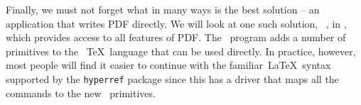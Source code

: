 Finally, we must not forget what in many ways is the best solution -- an
application that writes PDF directly. We will look at one such solution,
\pdfTEX\ , in , which provides access to all features of PDF.
The \pdfTEX\  program adds a number of primitives to the \ \TeX\
language that can be used directly. In practice, however, most people
will find it easier to continue with the familiar\ \LaTeX\ syntax
supported by the \verb|hyperref| package since this has a driver that
maps all the commands to the new \pdfTEX\  primitives. 

